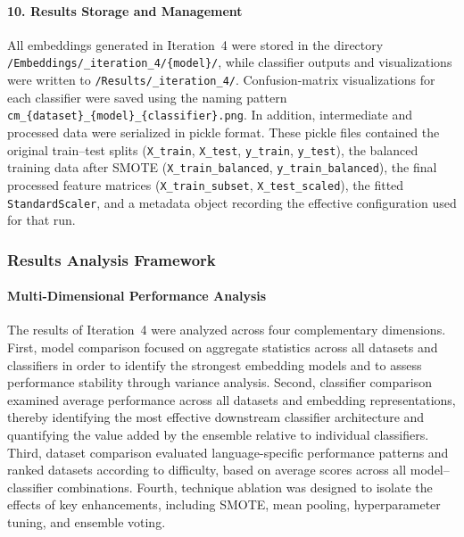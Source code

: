 \documentclass[11pt, titlepage, bibliography=totoc]{scrreprt}
\begin{document}
\paragraph{10. Results Storage and Management}
All embeddings generated in Iteration~4 were stored in the directory \texttt{/Embeddings/\_iteration\_4/\{model\}/}, while classifier outputs and visualizations were written to \texttt{/Results/\_iteration\_4/}. Confusion-matrix visualizations for each classifier were saved using the naming pattern \texttt{cm\_\{dataset\}\_\{model\}\_\{classifier\}.png}. In addition, intermediate and processed data were serialized in pickle format. These pickle files contained the original train--test splits (\texttt{X\_train}, \texttt{X\_test}, \texttt{y\_train}, \texttt{y\_test}), the balanced training data after SMOTE (\texttt{X\_train\_balanced}, \texttt{y\_train\_balanced}), the final processed feature matrices (\texttt{X\_train\_subset}, \texttt{X\_test\_scaled}), the fitted \texttt{StandardScaler}, and a metadata object recording the effective configuration used for that run.

\subsubsection{Results Analysis Framework}

\paragraph{Multi-Dimensional Performance Analysis}
The results of Iteration~4 were analyzed across four complementary dimensions. First, model comparison focused on aggregate statistics across all datasets and classifiers in order to identify the strongest embedding models and to assess performance stability through variance analysis. Second, classifier comparison examined average performance across all datasets and embedding representations, thereby identifying the most effective downstream classifier architecture and quantifying the value added by the ensemble relative to individual classifiers. Third, dataset comparison evaluated language-specific performance patterns and ranked datasets according to difficulty, based on average scores across all model--classifier combinations. Fourth, technique ablation was designed to isolate the effects of key enhancements, including SMOTE, mean pooling, hyperparameter tuning, and ensemble voting.
\end{document}
